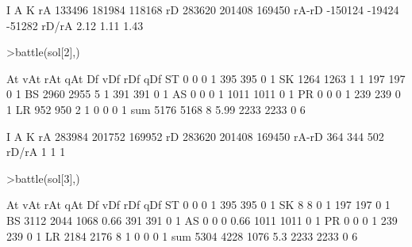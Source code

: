 \documentclass[a4paper,10pt]{article}
\begin{document}
\begin{eulernotebook}
\begin{euleroutput}
                     I         A         K
          rA    133496    181984    118168
          rD    283620    201408    169450
       rA-rD   -150124    -19424    -51282
       rD/rA      2.12      1.11      1.43
\end{euleroutput}
\begin{eulerprompt}
>battle(sol[2],)
\end{eulerprompt}
\begin{euleroutput}
                    At       vAt       rAt       qAt        Df       vDf       rDf       qDf
          ST         0         0         0         1       395       395         0         1
          SK      1264      1263         1         1       197       197         0         1
          BS      2960      2955         5         1       391       391         0         1
          AS         0         0         0         1      1011      1011         0         1
          PR         0         0         0         1       239       239         0         1
          LR       952       950         2         1         0         0         0         1
         sum      5176      5168         8      5.99      2233      2233         0         6
  
                     I         A         K
          rA    283984    201752    169952
          rD    283620    201408    169450
       rA-rD       364       344       502
       rD/rA         1         1         1
\end{euleroutput}
\begin{eulerprompt}
>battle(sol[3],)
\end{eulerprompt}
\begin{euleroutput}
                    At       vAt       rAt       qAt        Df       vDf       rDf       qDf
          ST         0         0         0         1       395       395         0         1
          SK         8         8         0         1       197       197         0         1
          BS      3112      2044      1068      0.66       391       391         0         1
          AS         0         0         0      0.66      1011      1011         0         1
          PR         0         0         0         1       239       239         0         1
          LR      2184      2176         8         1         0         0         0         1
         sum      5304      4228      1076       5.3      2233      2233         0         6
  

\end{euleroutput}
\end{eulernotebook}
\end{document}
